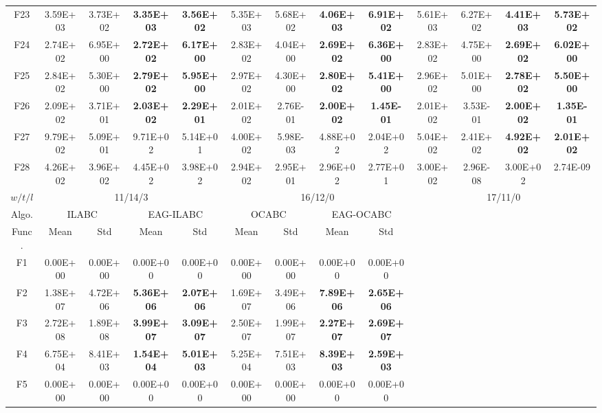 \begin{table*}[!ht]
\begin{tabular}{|c|cc|cc|cc|cc|cc|cc|}
    F23   & 3.59E+03 & 3.73E+02 & \textbf{3.35E+03} & \textbf{3.56E+02} & 5.35E+03 & 5.68E+02 & \textbf{4.06E+03} & \textbf{6.91E+02} & 5.61E+03 & 6.27E+02 & \textbf{4.41E+03} & \textbf{5.73E+02} \\
    F24   & 2.74E+02 & 6.95E+00 & \textbf{2.72E+02} & \textbf{6.17E+00} & 2.83E+02 & 4.04E+00 & \textbf{2.69E+02} & \textbf{6.36E+00} & 2.83E+02 & 4.75E+00 & \textbf{2.69E+02} & \textbf{6.02E+00} \\
    F25   & 2.84E+02 & 5.30E+00 & \textbf{2.79E+02} & \textbf{5.95E+00} & 2.97E+02 & 4.30E+00 & \textbf{2.80E+02} & \textbf{5.41E+00} & 2.96E+02 & 5.01E+00 & \textbf{2.78E+02} & \textbf{5.50E+00} \\
    F26   & 2.09E+02 & 3.71E+01 & \textbf{2.03E+02} & \textbf{2.29E+01} & 2.01E+02 & 2.76E-01 & \textbf{2.00E+02} & \textbf{1.45E-01} & 2.01E+02 & 3.53E-01 & \textbf{2.00E+02} & \textbf{1.35E-01} \\
    F27   & 9.79E+02 & 5.09E+01 & 9.71E+02 & 5.14E+01 & 4.00E+02 & 5.98E-03 & 4.88E+02 & 2.04E+02 & 5.04E+02 & 2.41E+02 & \textbf{4.92E+02} & \textbf{2.01E+02} \\
    F28   & 4.26E+02 & 3.96E+02 & 4.45E+02 & 3.98E+02 & 2.94E+02 & 2.95E+01 & 2.96E+02 & 2.77E+01 & 3.00E+02 & 2.96E-08 & 3.00E+02 & 2.74E-09 \\
   \hline
    $w/t/l$ & \multicolumn{4}{c|}{11/14/3}   & \multicolumn{4}{c|}{16/12/0}   & \multicolumn{4}{c|}{17/11/0} \\
    \hline
   \cline{1-9}
    Algo.   & \multicolumn{2}{c|}{ ILABC } & \multicolumn{2}{c|}{EAG-ILABC} & \multicolumn{2}{c|}{ OCABC } & \multicolumn{2}{c|}{EAG-OCABC}  \\ \cline{1-9}
    Func.   &  Mean  &  Std  & Mean  & Std   &  Mean  &  Std  & Mean  & Std    \\ \cline{1-9}
    F1    & 0.00E+00 & 0.00E+00 & 0.00E+00 & 0.00E+00 & 0.00E+00 & 0.00E+00 & 0.00E+00 & 0.00E+00 \\
    F2    & 1.38E+07 & 4.72E+06 & \textbf{5.36E+06} & \textbf{2.07E+06} & 1.69E+07 & 3.49E+06 & \textbf{7.89E+06} & \textbf{2.65E+06} \\
    F3    & 2.72E+08 & 1.89E+08 & \textbf{3.99E+07} & \textbf{3.09E+07} & 2.50E+07 & 1.99E+07 & \textbf{2.27E+07} & \textbf{2.69E+07} \\
    F4    & 6.75E+04 & 8.41E+03 & \textbf{1.54E+04} & \textbf{5.01E+03} & 5.25E+04 & 7.51E+03 & \textbf{8.39E+03} & \textbf{2.59E+03} \\
    F5    & 0.00E+00 & 0.00E+00 & 0.00E+00 & 0.00E+00 & 0.00E+00 & 0.00E+00 & 0.00E+00 & 0.00E+00 \\

\end{tabular}
\end{table*}
